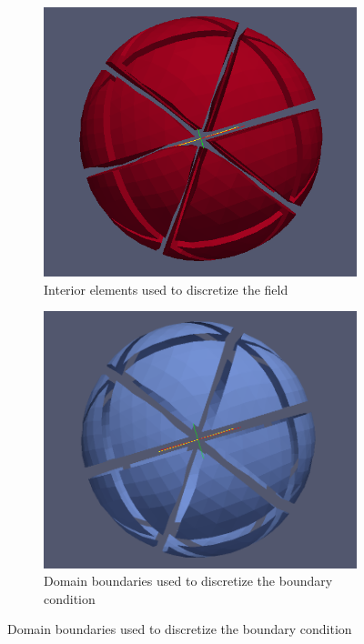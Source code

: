 \begin{figure}
	\begin{subfigure}[b]{0.30\textwidth} \hspace{4mm} \includegraphics[scale=0.22]{images/32-inter} \captionsetup{width=0.8\textwidth} \caption{ Interior elements used to discretize the field} \end{subfigure}
	\begin{subfigure}[b]{0.30\textwidth} \hspace{4mm} \includegraphics[scale=0.18]{images/32-db}    \captionsetup{width=0.8\textwidth} \caption{ Domain boundaries used to discretize the boundary condition} \end{subfigure}

\end{figure}

